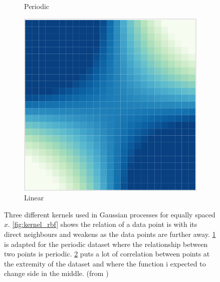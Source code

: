 \begin{figure}
\begin{subfigure}[b]{0.3\textwidth}
         \caption{Periodic}
         \label{fig:kernel_periodic}
     \end{subfigure}
     \hfill
     \begin{subfigure}[b]{0.3\textwidth}
         \centering
         \includegraphics[width=\textwidth]{Figures/kernel_linear.png}
         \caption{Linear}
         \label{fig:kernel_linear}
     \end{subfigure}
        \caption{Three different kernels used in Gaussian processes for equally spaced $x$. \ref{fig:kernel_rbf} shows the relation of a data point is with its direct neighbours and weakens as the data points are further away. \ref{fig:kernel_periodic} is adapted for the periodic dataset where the relationship between two points is periodic. \ref{fig:kernel_linear} puts a lot of correlation between points at the extremity of the dataset and where the function i expected to  change side in the middle. (from \cite{gortler_visual_2019})}
        \label{fig:gp_kernels_examples}
\end{figure}

